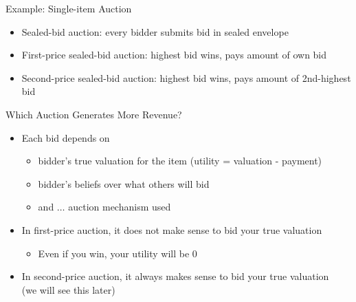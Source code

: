 \documentclass[11pt,aspectratio=169]{beamer}
\begin{document}
  \begin{frame}{Example: Single-item Auction}
   \begin{itemize}
   \setlength{\itemsep}{1.5em}
    \item \alert{Sealed-bid auction}: every bidder submits bid in sealed envelope
    \item \alert{First-price} sealed-bid auction: highest bid wins, pays amount of own bid
    \item \alert{Second-price} sealed-bid auction: highest bid wins, pays amount of 2nd-highest bid
   \end{itemize}
  \end{frame}
  
  \begin{frame}{Which Auction Generates More Revenue?}
   \begin{itemize}
   \setlength{\itemsep}{1.5em}
    \item Each bid depends on
    \begin{itemize}
     \item bidder's true valuation for the item (utility = valuation - payment)
     \item bidder's beliefs over what others will bid
     \item and $\dots$ auction mechanism used
    \end{itemize}
    \item In first-price auction, it does not make sense to bid your true valuation
    \begin{itemize}
     \item Even if you win, your utility will be 0
    \end{itemize}
    \item In second-price auction, it always makes sense to bid your true valuation \\ (we will see this later)
   \end{itemize}
  \end{frame}
  
\end{document}
